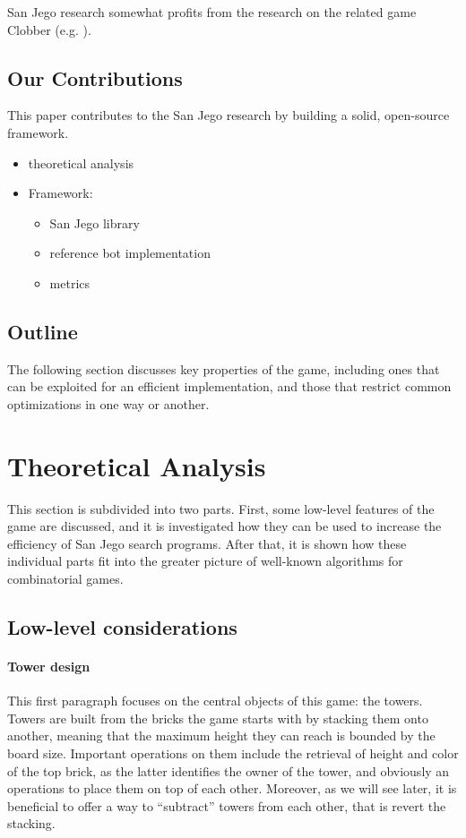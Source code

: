 \documentclass[sigconf]{acmart}
\begin{document}
San Jego research somewhat profits from the research on the related game Clobber (e.g. \cite{Althöfer2004}).

\subsection{Our Contributions}
This paper contributes to the San Jego research by building a solid, open-source framework.
\begin{itemize}
  \item theoretical analysis
  \item Framework:
  \begin{itemize}
    \item San Jego library
    \item reference bot implementation
    \item metrics
  \end{itemize}
\end{itemize}

\subsection{Outline}
The following section discusses key properties of the game, including ones that can be exploited for an efficient implementation, and those that restrict common optimizations in one way or another.

\section{Theoretical Analysis}
This section is subdivided into two parts.
First, some low-level features of the game are discussed, and it is investigated how they can be used to increase the efficiency of San Jego search programs.
After that, it is shown how these individual parts fit into the greater picture of well-known algorithms for combinatorial games.

\subsection{Low-level considerations}\label{subsec:low-level}
\paragraph{Tower design}
This first paragraph focuses on the central objects of this game: the towers.
Towers are built from the bricks the game starts with by stacking them onto another, meaning that the maximum height they can reach is bounded by the board size.
Important operations on them include the retrieval of height and color of the top brick, as the latter identifies the owner of the tower, and obviously an operations to place them on top of each other.
Moreover, as we will see later, it is beneficial to offer a way to \enquote{subtract} towers from each other, that is revert the stacking.
\end{document}

